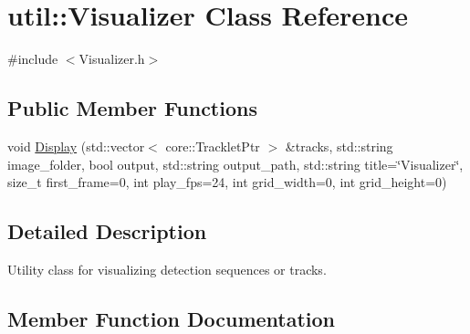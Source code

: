 \hypertarget{classutil_1_1Visualizer}{}\section{util\+:\+:Visualizer Class Reference}
\label{classutil_1_1Visualizer}


{\ttfamily \#include $<$Visualizer.\+h$>$}

\subsection*{Public Member Functions}
\begin{DoxyCompactItemize}
\item 
void \hyperlink{classutil_1_1Visualizer_a545d2f4aae7c3c54ecaee51461980036}{Display} (std\+::vector$<$ core\+::\+Tracklet\+Ptr $>$ \&tracks, std\+::string image\+\_\+folder, bool output, std\+::string output\+\_\+path, std\+::string title=\char`\"{}Visualizer\char`\"{}, size\+\_\+t first\+\_\+frame=0, int play\+\_\+fps=24, int grid\+\_\+width=0, int grid\+\_\+height=0)
\end{DoxyCompactItemize}


\subsection{Detailed Description}
Utility class for visualizing detection sequences or tracks. 

\subsection{Member Function Documentation}
